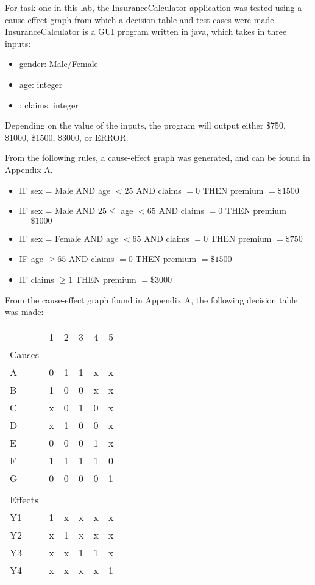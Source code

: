 For task one in this lab, the InsuranceCalculator application was tested using
a cause-effect graph from which a decision table and test cases were made.
InsuranceCalculator is a GUI program
written in java, which takes in three inputs:
\begin{itemize}
	\item gender: Male/Female
	\item age: integer
	\item: claims: integer
\end{itemize}
Depending on the value of the inputs, the program will output either \$750,
\$1000, \$1500, \$3000, or ERROR.

From the following rules, a cause-effect graph was generated, and can be found
in Appendix A.
\begin{itemize}
	\item IF sex = Male AND age $<25$ AND claims $=0$ THEN premium $=\$1500$
	\item IF sex = Male AND $25\leq$ age $<65$ AND claims $=0$ THEN premium
	      $=\$1000$

	\item IF sex = Female AND age $<65$ AND claims $=0$ THEN premium
	      $=\$750$
	\item IF age $\geq 65$ AND claims $=0$ THEN premium $=\$1500$
	\item IF claims $\geq 1$ THEN premium $=\$3000$
\end{itemize}

From the cause-effect graph found in Appendix A, the following decision table
was made:
\vspace{20pt}

\begin{adjustbox}{center}
	\begin{tabular}{llllll}
		        & 1 & 2 & 3 & 4 & 5 \\ \cline{2-6}
		Causes  &   &   &   &   &   \\ \cline{1-1}
		A       & 0 & 1 & 1 & x & x \\
		B       & 1 & 0 & 0 & x & x \\
		C       & x & 0 & 1 & 0 & x \\
		D       & x & 1 & 0 & 0 & x \\
		E       & 0 & 0 & 0 & 1 & x \\
		F       & 1 & 1 & 1 & 1 & 0 \\
		G       & 0 & 0 & 0 & 0 & 1 \\
		        &   &   &   &   &   \\
		Effects &   &   &   &   &   \\ \cline{1-1}
		Y1      & 1 & x & x & x & x \\
		Y2      & x & 1 & x & x & x \\
		Y3      & x & x & 1 & 1 & x \\
		Y4      & x & x & x & x & 1
	\end{tabular}%
\end{adjustbox}

